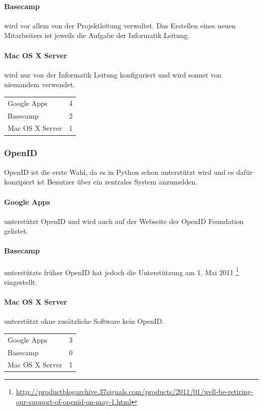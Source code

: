 \paragraph{Basecamp}
\label{par:1.3Basecamp}
wird vor allem von der Projektleitung verwaltet. Das Erstellen eines neuen Mitarbeiters ist jeweils die Aufgabe der Informatik Leitung.
\paragraph{Mac OS X Server}
\label{par:1.3Mac OS X Server}
wird nur von der Informatik Leitung konfiguriert und wird sonnst von niemandem verwendet.

\begin{tabular}{lc}
Google Apps & 4\\
Basecamp & 2\\
Mac OS X Server & 1\\
\end{tabular}

\subsubsection{OpenID}
\label{ssub:Bewertung OpenID}
OpenID ist die erste Wahl, da es in Python schon unterstützt wird und es dafür konzipiert ist Benutzer über ein zentrales System anzumelden.
\paragraph{Google Apps}
\label{par:2.1Google Apps}
unterstützt OpenID und wird auch auf der Webseite der OpenID Foundation gelistet.
\paragraph{Basecamp}
\label{par:2.1Basecamp}
unterstützte früher OpenID hat jedoch die Unterstützung am 1. Mai 2011 \footnote{\url{http://productblogarchive.37signals.com/products/2011/01/well-be-retiring-our-support-of-openid-on-may-1.html}} eingestellt.
\paragraph{Mac OS X Server}
\label{par:2.1Mac OS X Server}
unterstützt ohne zusätzliche Software kein OpenID.

\begin{tabular}{lc}
Google Apps & 3\\
Basecamp & 0\\
Mac OS X Server & 1\\
\end{tabular}

